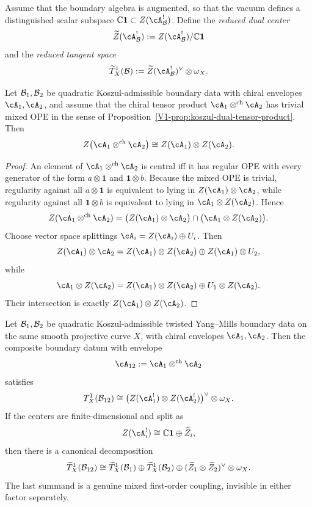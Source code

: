 \begin{definition}
Assume that the boundary algebra is augmented, so that the vacuum defines a distinguished scalar subspace $\mathbb{C}\mathbf{1} \subset Z(\cA_{\cB}^{!})$. Define the \emph{reduced dual center}
\[
\widetilde Z(\cA_{\cB}^{!}) := Z(\cA_{\cB}^{!})/\mathbb{C}\mathbf{1}
\]
and the \emph{reduced tangent space}
\[
\widetilde T^1_X(\cB) := \widetilde Z(\cA_{\cB}^{!})^{\vee}\otimes \omega_X.
\]
\end{definition}

\begin{lemma}
Let $\mathcal{B}_1,\mathcal{B}_2$ be quadratic Koszul-admissible boundary data with chiral envelopes $\cA_1,\cA_2$, and assume that the chiral tensor product $\cA_1\otimes^{\mathrm{ch}}\cA_2$ has trivial mixed OPE \/in the sense of Proposition~\ref*{V1-prop:koszul-dual-tensor-product}. Then
\[
Z\bigl(\cA_1\otimes^{\mathrm{ch}}\cA_2\bigr)
\cong
Z(\cA_1)\otimes Z(\cA_2).
\]
\end{lemma}

\begin{proof}
An element of $\cA_1\otimes^{\mathrm{ch}}\cA_2$ is central iff it has regular OPE with every generator of the form $a\otimes \mathbf{1}$ and $\mathbf{1}\otimes b$. Because the mixed OPE is trivial, regularity against all $a\otimes \mathbf{1}$ is equivalent to lying in $Z(\cA_1)\otimes \cA_2$, while regularity against all $\mathbf{1}\otimes b$ is equivalent to lying in $\cA_1\otimes Z(\cA_2)$. Hence
\[
Z(\cA_1\otimes^{\mathrm{ch}}\cA_2)
=
\bigl(Z(\cA_1)\otimes \cA_2\bigr)
\cap
\bigl(\cA_1\otimes Z(\cA_2)\bigr).
\]
Choose vector space splittings $\cA_i = Z(\cA_i)\oplus U_i$. Then
\[
Z(\cA_1)\otimes \cA_2
=
Z(\cA_1)\otimes Z(\cA_2)
\oplus
Z(\cA_1)\otimes U_2,
\]
while
\[
\cA_1\otimes Z(\cA_2)
=
Z(\cA_1)\otimes Z(\cA_2)
\oplus
U_1\otimes Z(\cA_2).
\]
Their intersection is exactly $Z(\cA_1)\otimes Z(\cA_2)$.
\end{proof}

\begin{theorem}
Let $\mathcal{B}_1,\mathcal{B}_2$ be quadratic Koszul-admissible twisted Yang--Mills boundary data on the same smooth projective curve $X$, with chiral envelopes $\cA_1,\cA_2$. Then the composite boundary datum with envelope
\[
\cA_{12}:=\cA_1\otimes^{\mathrm{ch}}\cA_2
\]
satisfies
\[
T^1_X(\cB_{12})
\cong
\bigl(Z(\cA_1^{!})\otimes Z(\cA_2^{!})\bigr)^{\vee}\otimes \omega_X.
\]
If the centers are finite-dimensional and split as
\[
Z(\cA_i^{!}) \cong \mathbb{C}\mathbf{1}\oplus \widetilde Z_i,
\]
then there is a canonical decomposition
\[
\widetilde T^1_X(\mathcal{B}_{12})
\cong
\widetilde T^1_X(\mathcal{B}_1)
\oplus
\widetilde T^1_X(\mathcal{B}_2)
\oplus
(\widetilde Z_1\otimes \widetilde Z_2)^{\vee}\otimes \omega_X.
\]
The last summand is a genuine mixed first-order coupling, invisible in either factor separately.
\end{theorem}

